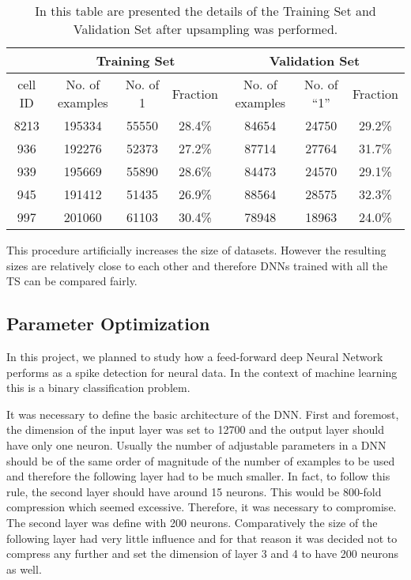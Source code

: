 \documentclass{article}
\begin{document}
\begin{table}[htbp]
\begin{center}
\begin{tabular}{c|ccc|ccc}

\multicolumn{1}{l|}{} & \multicolumn{ 3}{c|}{Training Set} & \multicolumn{ 3}{c}{Validation Set} \\ \hline
cell ID & No. of examples & No. of 1 & Fraction & No. of examples & No. of “1” & Fraction  \\ \hline
8213 & 195334 & 55550 & 28.4\% & 84654 & 24750 & 29.2\% \\ 
936 & 192276 & 52373 & 27.2\% & 87714 & 27764 & 31.7\% \\ 
939 & 195669 & 55890 & 28.6\% & 84473 & 24570 & 29.1\% \\ 
945 & 191412 & 51435 & 26.9\% & 88564 & 28575 & 32.3\% \\ 
997 & 201060 & 61103 & 30.4\% & 78948 & 18963 & 24.0\% \\ 
\end{tabular}
\end{center}
\caption{In this table are presented the details of the Training Set and Validation Set after upsampling was performed. }
\label{table:summary-afterUS}
\end{table}

This procedure artificially increases the size of datasets. However the resulting sizes are relatively close to each other and therefore DNNs trained with all the TS can be compared fairly.

\subsection{Parameter Optimization}
In this project, we planned to study how a  feed-forward deep Neural Network performs as a spike detection for neural data. In the context of machine learning this is a binary classification problem.

It was necessary to define the basic architecture of the DNN. First and foremost, the dimension of the input layer was set to 12700 and the output layer should have only one neuron.
Usually the number of adjustable parameters in a DNN should be of the same order of magnitude of the number of examples to be used and therefore the following layer had to be much smaller. In fact, to follow this rule, the second layer should have around 15 neurons. This would be 800-fold compression which seemed excessive. Therefore, it was necessary to compromise. The second layer was define with 200 neurons. Comparatively the size of the following layer had very little influence and for that reason it was decided not to compress any further and set the dimension of layer 3 and 4 to have 200 neurons as well. 
\end{document}
